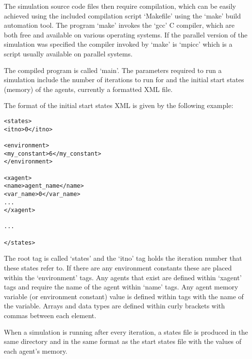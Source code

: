The simulation source code files then require compilation, which can be easily
achieved using the included compilation script `Makefile' using the `make'
build automation tool. The program `make' invokes the `gcc' C compiler, which
are both free and available on various operating systems. If the parallel
version of the simulation was specified the compiler invoked by `make' is
`mpicc' which is a script usually available on parallel systems.

The compiled program is called `main'. The parameters required to run a
simulation include the number of iterations to run for and the initial start
states (memory) of the agents, currently a formatted XML file.

The format of the initial start states XML is given by the following example:

\begin{mylisting}
\begin{verbatim}
<states>
<itno>0</itno>

<environment>
<my_constant>6</my_constant>
</environment>

<xagent>
<name>agent_name</name>
<var_name>0</var_name>
...
</xagent>

...

</states>
\end{verbatim}
\end{mylisting}

The root tag is called `states' and the `itno' tag holds the iteration number
that these states refer to. If there are any environment constants these are
placed within the `environment' tags. Any agents that exist are defined within
`xagent' tags and require the name of the agent within `name' tags. Any agent
memory variable (or environment constant) value is defined within tags with
the name of the variable. Arrays and data types are defined within curly
brackets with commas between each element.

When a simulation is running after every iteration, a states file is produced
in the same directory and in the same format as the start states file with the
values of each agent's memory.
